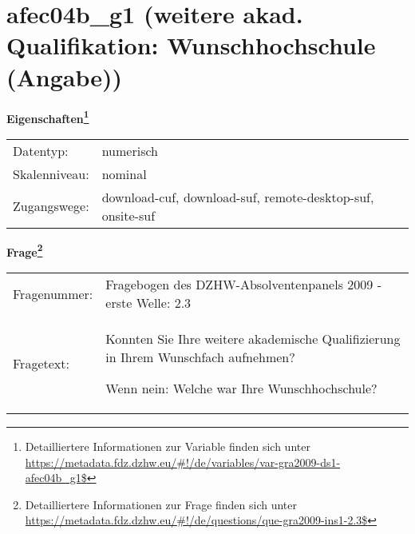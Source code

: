 
    \setcounter{footnote}{0}

    \vspace*{-1.8cm}
	\section{afec04b\_g1 (weitere akad. Qualifikation: Wunschhochschule (Angabe))}
	\label{section:afec04b_g1}



    \vspace*{0.5cm}
    \noindent\textbf{Eigenschaften\footnote{Detailliertere Informationen zur Variable finden sich unter
		\url{https://metadata.fdz.dzhw.eu/\#!/de/variables/var-gra2009-ds1-afec04b_g1$}}}\\
	\begin{tabularx}{\hsize}{@{}lX}
	Datentyp: & numerisch \\
	Skalenniveau: & nominal \\
	Zugangswege: &
	  download-cuf, 
	  download-suf, 
	  remote-desktop-suf, 
	  onsite-suf
 \\
    \end{tabularx}



				\vspace*{0.5cm}
                \noindent\textbf{Frage\footnote{Detailliertere Informationen zur Frage finden sich unter
		              \url{https://metadata.fdz.dzhw.eu/\#!/de/questions/que-gra2009-ins1-2.3$}}}\\
				\begin{tabularx}{\hsize}{@{}lX}
					Fragenummer: &
					  Fragebogen des DZHW-Absolventenpanels 2009 - erste Welle:
					  2.3
 \\
					Fragetext: & Konnten Sie Ihre weitere akademische Qualifizierung in Ihrem Wunschfach aufnehmen?\par  Wenn nein: Welche war Ihre Wunschhochschule? \\
				\end{tabularx}





